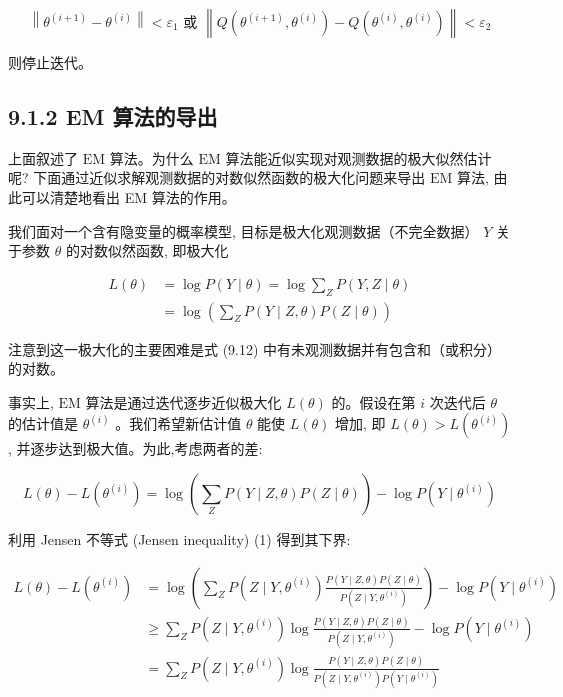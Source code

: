 \documentclass[10pt]{article}
\begin{document}
$$
\left\|\theta^{(i+1)}-\theta^{(i)}\right\|<\varepsilon_{1} \text { 或 }\left\|Q\left(\theta^{(i+1)}, \theta^{(i)}\right)-Q\left(\theta^{(i)}, \theta^{(i)}\right)\right\|<\varepsilon_{2}
$$

则停止迭代。

\subsection*{9.1.2 EM 算法的导出}
上面叙述了 $\mathrm{EM}$ 算法。为什么 $\mathrm{EM}$ 算法能近似实现对观测数据的极大似然估计呢? 下面通过近似求解观测数据的对数似然函数的极大化问题来导出 $\mathrm{EM}$ 算法, 由此可以清楚地看出 EM 算法的作用。

我们面对一个含有隐变量的概率模型, 目标是极大化观测数据（不完全数据） $Y$ 关于参数 $\theta$ 的对数似然函数, 即极大化


\begin{align*}
L(\theta) & =\log P(Y \mid \theta)=\log \sum_{Z} P(Y, Z \mid \theta) \\
& =\log \left(\sum_{Z} P(Y \mid Z, \theta) P(Z \mid \theta)\right) \tag{9.12}
\end{align*}


注意到这一极大化的主要困难是式 (9.12) 中有未观测数据并有包含和（或积分）的对数。

事实上, $\mathrm{EM}$ 算法是通过迭代逐步近似极大化 $L(\theta)$ 的。假设在第 $i$ 次迭代后 $\theta$ 的估计值是 $\theta^{(i)}$ 。我们希望新估计值 $\theta$ 能使 $L(\theta)$ 增加, 即 $L(\theta)>L\left(\theta^{(i)}\right)$, 并逐步达到极大值。为此,考虑两者的差:

$$
L(\theta)-L\left(\theta^{(i)}\right)=\log \left(\sum_{Z} P(Y \mid Z, \theta) P(Z \mid \theta)\right)-\log P\left(Y \mid \theta^{(i)}\right)
$$

利用 Jensen 不等式 (Jensen inequality) (1) 得到其下界:

$$
\begin{aligned}
L(\theta)-L\left(\theta^{(i)}\right) & =\log \left(\sum_{Z} P\left(Z \mid Y, \theta^{(i)}\right) \frac{P(Y \mid Z, \theta) P(Z \mid \theta)}{P\left(Z \mid Y, \theta^{(i)}\right)}\right)-\log P\left(Y \mid \theta^{(i)}\right) \\
& \geqslant \sum_{Z} P\left(Z \mid Y, \theta^{(i)}\right) \log \frac{P(Y \mid Z, \theta) P(Z \mid \theta)}{P\left(Z \mid Y, \theta^{(i)}\right)}-\log P\left(Y \mid \theta^{(i)}\right) \\
& =\sum_{Z} P\left(Z \mid Y, \theta^{(i)}\right) \log \frac{P(Y \mid Z, \theta) P(Z \mid \theta)}{P\left(Z \mid Y, \theta^{(i)}\right) P\left(Y \mid \theta^{(i)}\right)}
\end{aligned}
$$
\end{document}

